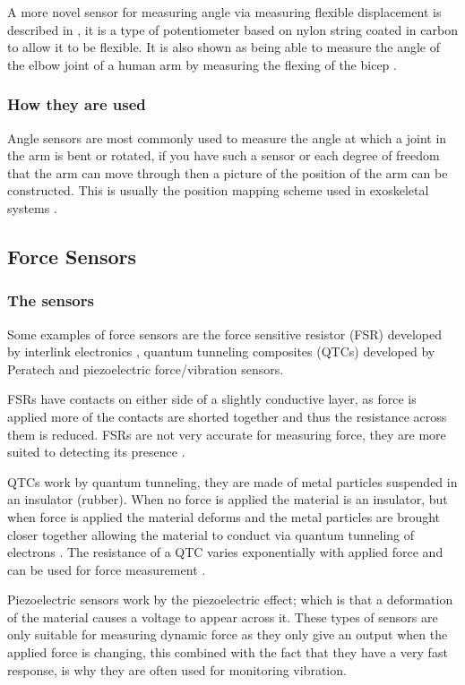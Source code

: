 \documentclass[journal]{IEEEtran}
\begin{document}
A more novel sensor for measuring angle via measuring flexible displacement is described in \cite{flexiSensor}, 
it is a type of potentiometer based on nylon string coated in carbon to allow it to be flexible. It is also shown as 
being able to measure the angle of the elbow joint of a human arm by measuring the flexing of the bicep \cite{flexiSensor}.

\subsubsection{How they are used}
Angle sensors are most commonly used to measure the angle at which a joint in the arm is bent or 
rotated, if you have such a sensor or each degree of freedom that the arm can move through then a 
picture of the position of the arm can be constructed. This is usually the position mapping scheme 
used in exoskeletal systems \cite{AdvancesPush}.

\subsection{Force Sensors}
\subsubsection{The sensors}
Some examples of force sensors are the force sensitive resistor (FSR) developed by interlink 
electronics \cite{FSR,Interlink}, quantum tunneling composites (QTCs) developed by Peratech \cite{QTCs} and 
piezoelectric force/vibration sensors.

FSRs have contacts on either side of a slightly conductive layer, as force is applied more of 
the contacts are shorted together and thus the resistance across them is reduced. FSRs 
are not very accurate for measuring force, they are more suited to detecting its presence \cite{FSR}.

QTCs work by quantum tunneling, they are made of metal particles suspended in an insulator 
(rubber). When no force is applied the material is an insulator, but when force is applied the 
material deforms and the metal particles are brought closer together allowing the material to 
conduct via quantum tunneling of electrons \cite{QTCs}. The resistance of a QTC varies 
exponentially with applied force and can be used for force measurement \cite{QTCs}.

Piezoelectric sensors work by the piezoelectric effect; which is that a deformation of the material 
causes a voltage to appear across it. These types of sensors are only suitable for measuring 
dynamic force as they only give an output when the applied force is changing, this combined 
with the fact that they have a very fast response, is why they are often used for monitoring 
vibration.
\end{document}

